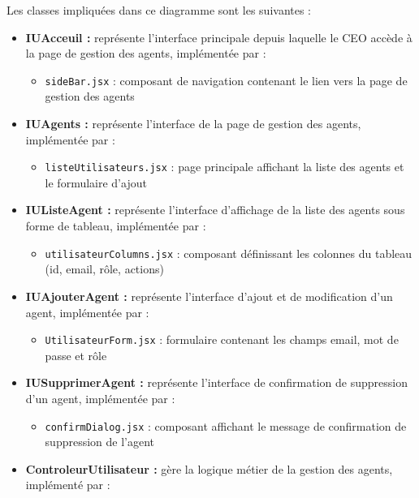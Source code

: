 Les classes impliquées dans ce diagramme sont les suivantes :
\begin{itemize}[leftmargin=2em, topsep=4pt, itemsep=4pt]
  \item \textbf{IUAcceuil :} représente l'interface principale depuis laquelle le CEO accède à la page de gestion des agents, implémentée par :
  \begin{itemize}[leftmargin=2em, topsep=2pt, itemsep=2pt]
    \item \texttt{sideBar.jsx} : composant de navigation contenant le lien vers la page de gestion des agents
  \end{itemize}
  \item \textbf{IUAgents :} représente l'interface de la page de gestion des agents, implémentée par :
  \begin{itemize}[leftmargin=2em, topsep=2pt, itemsep=2pt]
    \item \texttt{listeUtilisateurs.jsx} : page principale affichant la liste des agents et le formulaire d'ajout
  \end{itemize}
  \item \textbf{IUListeAgent :} représente l'interface d'affichage de la liste des agents sous forme de tableau, implémentée par :
  \begin{itemize}[leftmargin=2em, topsep=2pt, itemsep=2pt]
    \item \texttt{utilisateurColumns.jsx} : composant définissant les colonnes du tableau (id, email, rôle, actions)
  \end{itemize}
  \item \textbf{IUAjouterAgent :} représente l'interface d'ajout et de modification d'un agent, implémentée par :
  \begin{itemize}[leftmargin=2em, topsep=2pt, itemsep=2pt]
    \item \texttt{UtilisateurForm.jsx} : formulaire contenant les champs email, mot de passe et rôle
  \end{itemize}
  \item \textbf{IUSupprimerAgent :} représente l'interface de confirmation de suppression d'un agent, implémentée par :
  \begin{itemize}[leftmargin=2em, topsep=2pt, itemsep=2pt]
    \item \texttt{confirmDialog.jsx} : composant affichant le message de confirmation de suppression de l'agent
  \end{itemize}
  \item \textbf{ControleurUtilisateur :} gère la logique métier de la gestion des agents, implémenté par :

\end{itemize}
